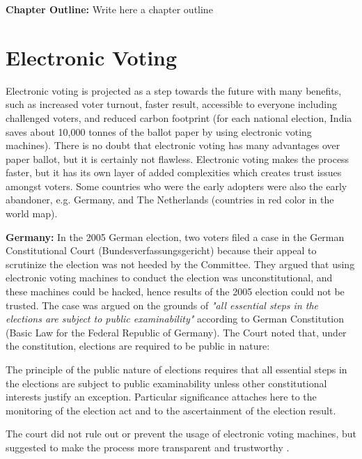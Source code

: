  
\textbf{Chapter Outline:}
  Write here a chapter outline

\section{Electronic Voting}
  Electronic voting is projected as a step towards the future with 
  many benefits, such as increased voter turnout, faster result, 
  accessible to everyone including challenged voters, and reduced 
  carbon footprint (for each 
  national election, India saves about 10,000 tonnes of the ballot 
  paper by using electronic voting machines).
  There is no doubt that electronic voting has many advantages 
  over paper ballot, but it is certainly not flawless.  
  Electronic voting makes 
  the process faster, but it has its own layer of added complexities 
  which creates trust issues amongst voters. Some countries 
  who were the early adopters were also the early abandoner, e.g.
  Germany, and The Netherlands (countries in red color in the world map).
  
  
  \textbf{Germany:} In the 2005 German election, two voters filed a case in the German 
  Constitutional Court (Bundesverfassungsgericht) because their 
  appeal to scrutinize the election 
  was not heeded by the Committee. They argued that using electronic 
  voting machines to conduct the election was unconstitutional, and 
  these machines could be hacked, hence results of the 2005 election 
  could not be trusted. The case was argued on the grounds 
  of  \textit{"all essential steps in the elections are subject to 
  public examinability"} according to German Constitution 
  (Basic Law for the Federal Republic of Germany). 
  The Court noted that, under the constitution, elections are 
  required to be public in nature:\citep{Germanconst}
  
  \begin{displayquote}
  The principle of the public nature of elections requires that all 
  essential steps in the elections are subject to public examinability
  unless other constitutional interests justify an exception. 
  Particular significance attaches here to the monitoring of the 
  election act and to the ascertainment of the election result.
  \end{displayquote}
  
 
 
  \noindent	
  The court did not rule out or prevent the usage of electronic 
  voting machines,  but suggested to make the process more 
  transparent and trustworthy \citep{Germanconst}.  
  
